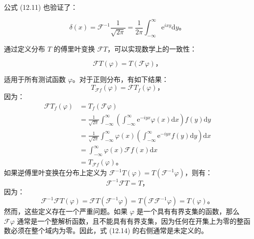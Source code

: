 公式 (12.11) 也验证了：

\begin{equation}\label{eq:12.13} 
 \delta(x) = \mathcal{F}^{-1} \frac{1}{\sqrt{2 \pi}} = \frac{1}{2 \pi} \int_{-\infty}^\infty \mathrm{e}^{i x y} \mathrm{d}y。 
 \end{equation}

通过定义分布 $T$ 的傅里叶变换
$\mathcal{F} T$，可以实现数学上的一致性：

\begin{equation}\label{eq:12.14} 
 \mathcal{F} T(\varphi)=T(\mathcal{F} \varphi)， 
 \end{equation}

适用于所有测试函数 $\varphi$。对于正则分布，有如下结果：
 $$
T_{\mathcal{F} f}(\varphi) = \mathcal{F} T_f(\varphi)，
$$
因为：
 $$
\begin{aligned}
\mathcal{F} T_f(\varphi) & = T_f(\mathcal{F} \varphi) \\
& = \frac{1}{\sqrt{2 \pi}} \int_{-\infty}^\infty \left(\int_{-\infty}^\infty \mathrm{e}^{-i y x} \varphi(x) \mathrm{d}x \right) f(y) \mathrm{d}y \\
& = \frac{1}{\sqrt{2 \pi}} \int_{-\infty}^\infty \varphi(x) \left(\int_{-\infty}^\infty \mathrm{e}^{-i y x} f(y) \mathrm{d}y \right) \mathrm{d}x \\
& = \int_{-\infty}^\infty \varphi(x) \mathcal{F} f(x) \mathrm{d}x \\
& = T_{\mathcal{F} f}(\varphi)。
\end{aligned}
$$
如果逆傅里叶变换在分布上定义为
$\mathcal{F}^{-1} T(\varphi)=T\left(\mathcal{F}^{-1} \varphi\right)$，则有：
 $$
\mathcal{F}^{-1} \mathcal{F} T = T，
$$
因为：
 $$
\mathcal{F}^{-1} \mathcal{F} T(\varphi) = \mathcal{F} T\left(\mathcal{F}^{-1} \varphi\right) = T\left(\mathcal{F F}^{-1} \varphi\right) = T(\varphi)。
$$
然而，这些定义存在一个严重问题。如果 $\varphi$
是一个具有有界支集的函数，那么 $\mathcal{F} \varphi$
通常是一个整解析函数，且不能具有有界支集，因为任何在开集上为零的整函数必须在整个域内为零。因此，式
(12.14) 的右侧通常是未定义的。

